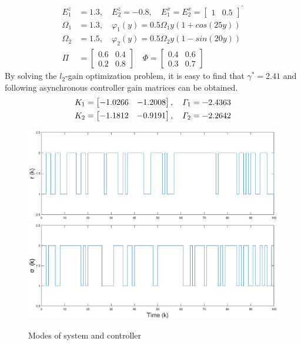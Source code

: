 \documentclass[conference]{IEEEtran}
\begin{document}
\begin{equation}
\begin{aligned}
		E^{z}_{1}&= 1.3,\quad E^{z}_{2} = -0.8,\quad 	E^{x}_{1} = E^{x}_{2}= \begin{bmatrix} 
			1&0.5
		\end{bmatrix}^{'}\\
		\varOmega_{1}&=1.3, \quad \varphi_{1}(y)=0.5\varOmega_{1}y(1+cos(25y)) \\ 
		\varOmega_{2}&=1.5,\quad \varphi_{2}(y)=0.5\varOmega_{2}y(1-sin(20y)) \\
		\varPi&=\begin{bmatrix}
			0.6&0.4\\
			0.2&0.8
		\end{bmatrix} \quad
		\varPhi=\begin{bmatrix}
			0.4&0.6\\
			0.3&0.7
		\end{bmatrix}
	\end{aligned}  
\end{equation}
By solving the $l_2$-gain optimization problem, it is easy to find that $\gamma^{*}=2.41$ and following asynchronous controller gain matrices can be obtained.
\begin{equation}\notag
	\begin{aligned}
		K_{1}=\begin{bmatrix}
			-1.0266&-1.2008
		\end{bmatrix},\quad
		\varGamma_{1}=-2.4363 \\
		K_{2}=\begin{bmatrix}
		-1.1812&-0.9191
		\end{bmatrix},\quad
		\varGamma_{2}=-2.2642
	\end{aligned}
\end{equation}

\begin{figure}[!htb]
	\centering\includegraphics[scale=0.25]{./simulink/mode_p.eps}\\ 
	\centering\includegraphics[scale=0.25]{./simulink/mode_k.eps}\\ 
	\caption{Modes of system and controller}
	\label{fig.1}
\end{figure}
\end{document}
